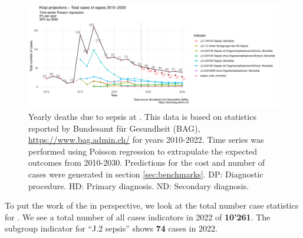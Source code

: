
\begin{figure}[h] \hspace*{0cm} 
\begin{center}
	\includegraphics[width=1\textwidth]{../../stats/foph_key_stats/output/p_cases_sepsis_kispi_yearly_forecast}
	\caption{Yearly deaths due to sepsis at \kispi.
	This data is based on statistics reported by Bundesamt für Gesundheit (BAG), 
	\url{https://www.bag.admin.ch/} for years 2010-2022. 
	Time series was performed using Poisson regression to extrapulate the expected outcomes from 2010-2030.
	Predictions for the cost and number of cases were generated in section 
	\ref{sec:benchmarks}.	
	DP: Diagnostic procedure.
HD: Primary diagnosis.
ND: Secondary diagnosis.}
	\label{fig:p_cases_sepsis_kispi_yearly_forecast}
\end{center}
\end{figure}

To put the work of the \pmu in perspective, we look at the total number case statistics for \kispi.
We see a total number of all cases indicators in 2022 of \textbf{10'261}.
The subgroup indicator for ``J.2 sepsis'' shows \textbf{74} cases in 2022.

